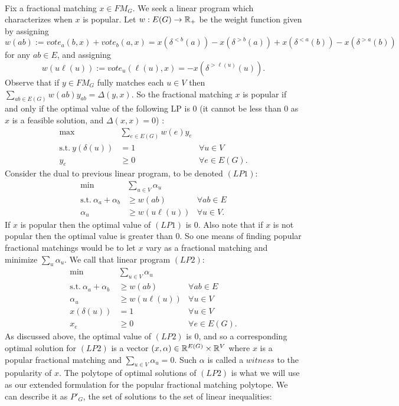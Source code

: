 \documentclass[letterpaper,12pt,oneside,onecolumn]{article}
\begin{document}
\paragraph{}
Fix a fractional matching $x \in FM_G$.  We seek a linear program which characterizes when $x$ is popular. Let $w: E(G) \rightarrow \mathbb{R}_+$ be the weight function given by assigning  $$w(ab) := vote_a(b,x) + vote_b(a,x) = x(\delta^{<b}(a)) - x(\delta^{>b}(a)) + x(\delta^{<a}(b)) - x(\delta^{>a}(b))$$
for any $ab \in E$, and assigning
$$w(u\ell(u)) := vote_u(\ell(u),x) = -x(\delta^{>\ell(u)}(u)).$$
Observe that if $y \in FM_G$ fully matches each $u \in V$ then $\sum_{ab \in E(G)} w(ab)y_{ab} = \Delta(y,x).$ So the fractional matching $x$ is popular if and only if the optimal value of the following LP is $0$ (it cannot be less than $0$ as $x$ is a feasible solution, and $\Delta(x,x) = 0$) :
\begin{align*}
\max\  &\sum_{e \in E(G)} w(e) y_{e} \\
\text{s.t.}\ y(\delta(u)) &= 1 &\forall u \in V \\
y_e &\geq 0 &\forall e \in E(G).
\end{align*}
Consider the dual to previous linear program, to be denoted $(LP1)$:
\begin{align*}
\min\ &\sum_{u \in V} \alpha_u \\
\text{s.t.}\ \alpha_a + \alpha_b &\geq w(ab) &\forall ab \in E \\
\alpha_u &\geq w(u\ell(u)) &\forall u \in V.
\end{align*}
If $x$ is popular then the optimal value of $(LP1)$ is $0$. Also note that if $x$ is not popular then the optimal value is greater than $0$. So one means of finding popular fractional matchings would be to let $x$ vary as a fractional matching and minimize $\sum_{u} \alpha_u$. We call that linear program $(LP2)$:
\begin{align*}
\min\ &\sum_{u \in V} \alpha_u \\
\text{s.t.}\ \alpha_a + \alpha_b &\geq w(ab) &\forall ab \in E \\
\alpha_u &\geq w(u\ell(u)) &\forall u \in V \\
x(\delta(u)) &= 1 &\forall u \in V \\
x_e &\geq 0 &\forall e \in E(G).
\end{align*}
As discussed above, the optimal value of $(LP2)$ is $0$, and so a corresponding optimal solution for $(LP2)$ is a vector $(x,\alpha) \in \mathbb{R}^{E(G)}\times \mathbb{R}^{V}$ where $x$ is a popular fractional matching and $\sum_{u \in V} \alpha_u = 0$. Such $\alpha$ is called a $\textit{witness}$ to the popularity of $x$. The polytope of optimal solutions of $(LP2)$ is what we will use as our extended formulation for the popular fractional matching polytope. We can describe it as $P'_G$, the set of solutions to the set of linear inequalities:
\end{document}
